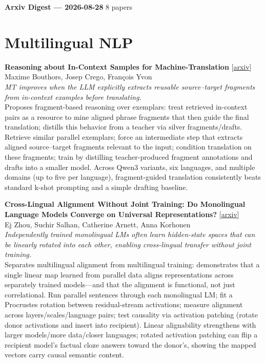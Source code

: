 \documentclass[12pt,letterpaper]{article}
\begin{document}
{\footnotesize\textbf{Arxiv Digest --- 2026-08-28} \hfill 8 papers}

\smallskip

\section*{Multilingual NLP}

{\small\textbf{Reasoning about In-Context Samples for Machine-Translation}} {\scriptsize[\href{https://arxiv.org/abs/2608.27036}{arxiv}]}\\
{\scriptsize Maxime Bouthors, Josep Crego, Fran\c{c}ois Yvon}\\

{\small\textit{MT improves when the LLM explicitly extracts reusable source--target fragments from in-context examples before translating.}}\\[1pt]
{\footnotesize Proposes fragment-based reasoning over exemplars: treat retrieved in-context pairs as a resource to mine aligned phrase fragments that then guide the final translation; distills this behavior from a teacher via silver fragments/drafts. Retrieve similar parallel exemplars; force an intermediate step that extracts aligned source--target fragments relevant to the input; condition translation on these fragments; train by distilling teacher-produced fragment annotations and drafts into a smaller model. Across Qwen3 variants, six languages, and multiple domains (up to five per language), fragment-guided translation consistently beats standard k-shot prompting and a simple drafting baseline.}

\medskip

{\small\textbf{Cross-Lingual Alignment Without Joint Training: Do Monolingual Language Models Converge on Universal Representations?}} {\scriptsize[\href{https://arxiv.org/abs/2608.27115}{arxiv}]}\\
{\scriptsize Ej Zhou, Suchir Salhan, Catherine Arnett, Anna Korhonen}\\

{\small\textit{Independently trained monolingual LMs often learn hidden-state spaces that can be linearly rotated into each other, enabling cross-lingual transfer without joint training.}}\\[1pt]
{\footnotesize Separates multilingual alignment from multilingual training: demonstrates that a single linear map learned from parallel data aligns representations across separately trained models---and that the alignment is functional, not just correlational. Run parallel sentences through each monolingual LM; fit a Procrustes rotation between residual-stream activations; measure alignment across layers/scales/language pairs; test causality via activation patching (rotate donor activations and insert into recipient). Linear alignability strengthens with larger models/more data/closer languages; rotated activation patching can flip a recipient model's factual cloze answers toward the donor's, showing the mapped vectors carry causal semantic content.}
\end{document}
